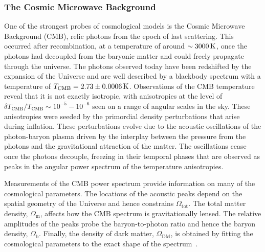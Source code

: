 \subsubsection*{The Cosmic Microwave Background}
One of the strongest probes of cosmological models is the Cosmic Microwave Background (CMB), relic photons from the epoch of last scattering. This occurred after recombination, at a temperature of around $\sim 3000 {\rm \,K}$, once the photons had decoupled from the baryonic matter and could freely propagate through the universe. The photons observed today have been redshifted by the expansion of the Universe and are well described by a blackbody spectrum with a temperature of $T_\mathrm{CMB} = 2.73\pm 0.0006{\rm \,K}$. Observations of the CMB temperature reveal that it is not exactly isotropic, with anisotropies at the level of $\delta T_\mathrm{CMB}/T_\mathrm{CMB}\sim 10^{-5} - 10^{-6} $ seen on a range of angular scales in the sky. These anisotropies were seeded by the primordial density perturbations that arise during inflation. These perturbations evolve due to the acoustic oscillations of the photon-baryon plasma driven by the interplay between the pressure from the photons and the gravitational attraction of the matter. The oscillations cease once the photons decouple, freezing in their temporal phases that are observed as peaks in the angular power spectrum of the temperature anisotropies. 

Measurements of the CMB power spectrum provide information on many of the cosmological parameters. The locations of the acoustic peaks depend on the spatial geometry of the Universe and hence constrains $\Omega_\mathrm{tot}$. The total matter density, $\Omega_\mathrm{m}$, affects how the CMB spectrum is gravitationally lensed.  The relative amplitudes of the peaks probe the baryon-to-photon ratio and hence the baryon density, $\Omega_\mathrm{b}$. Finally, the density of dark matter, $\Omega_\mathrm{DM}$, is obtained by fitting the cosmological parameters to the exact shape of the spectrum~\cite{Freese:2008cz_may_ReviewObservationalEvidence, Planck:2018vyg_sep_Planck2018results}. 


